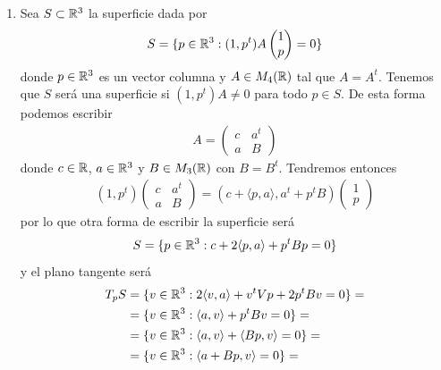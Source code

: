 \begin{ejercicio}
\begin{enumerate}
        \item Sea $S\subset \mathbb{R}^3$ la superficie dada por 
        \begin{gather*}
            S = \{p \in \mathbb{R}^3 : (1,p^t)A \begin{pmatrix}
                1 \\ p
            \end{pmatrix} = 0\}
        \end{gather*}
        donde $p\in \mathbb{R}^3$ es un vector columna y $A\in M_4(\mathbb{R})$ tal que $A=A^t$. Tenemos que $S$ será una superficie si $(1,p^t)A\neq 0$ para todo $p\in S$. De esta forma podemos escribir 
        \begin{gather*}
            A = \left(
                \begin{array}{c|c}
                    c & a^t\\
                    \hline
                    a & B
                \end{array}
            \right)
        \end{gather*}
        donde $c\in \mathbb{R}$, $a\in \mathbb{R}^3$ y $B\in M_3(\mathbb{R})$ con $B=B^t$. Tendremos entonces
        \begin{gather*}
            (1,p^t)\left(
                \begin{array}{c|c}
                    c & a^t\\
                    \hline
                    a & B
                \end{array}
            \right) = (c+\langle p , a \rangle, a^t + p^t B) \begin{pmatrix}
                1 \\ p
            \end{pmatrix}
        \end{gather*}
        por lo que otra forma de escribir la superficie será 
        \begin{gather*}
            S = \{p\in \mathbb{R}^3 : c +2\langle p,a \rangle + p^tBp = 0\}
        \end{gather*}
        y el plano tangente será 
        \begin{align*}
            T_pS &= \{v\in \bb{R}^3 : 2 \langle v,a \rangle + v^tVp + 2p^tBv = 0\} = \\
            &= \{v\in \bb{R}^3 : \langle a,v \rangle + p^tBv = 0\} =\\
            &= \{v\in \bb{R}^3 : \langle a,v \rangle + \langle Bp, v \rangle = 0\} =\\
            &= \{v\in \bb{R}^3 : \langle a +Bp, v \rangle = 0\} =\\

\end{align*}
\end{enumerate}
\end{ejercicio}
